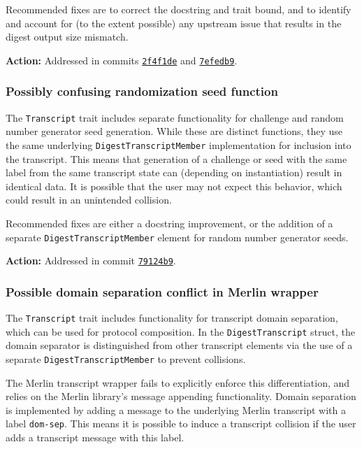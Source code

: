 \documentclass{article}
\begin{document}
Recommended fixes are to correct the docstring and trait bound, and to identify and account for (to the extent possible) any upstream issue that results in the digest output size mismatch.

\textbf{Action:} Addressed in commits \href{https://github.com/serai-dex/serai/commit/2f4f1de488272bc0d4f3a040e253534c24f7e7bb}{\texttt{2f4f1de}} and \href{https://github.com/serai-dex/serai/commit/7efedb9a9136ec3e37fec1cb35f33a8426d89a90}{\texttt{7efedb9}}.


\subsubsection{Possibly confusing randomization seed function}

The \texttt{Transcript} trait includes separate functionality for challenge and random number generator seed generation.
While these are distinct functions, they use the same underlying \texttt{DigestTranscriptMember} implementation for inclusion into the transcript.
This means that generation of a challenge or seed with the same label from the same transcript state can (depending on instantiation) result in identical data.
It is possible that the user may not expect this behavior, which could result in an unintended collision.

Recommended fixes are either a docstring improvement, or the addition of a separate \texttt{DigestTranscriptMember} element for random number generator seeds.

\textbf{Action:} Addressed in commit \href{https://github.com/serai-dex/serai/commit/79124b9a3394ae1eaadf066fb7bc431afdaf5be3}{\texttt{79124b9}}.


\subsubsection{Possible domain separation conflict in Merlin wrapper}

The \texttt{Transcript} trait includes functionality for transcript domain separation, which can be used for protocol composition.
In the \texttt{DigestTranscript} struct, the domain separator is distinguished from other transcript elements via the use of a separate \texttt{DigestTranscriptMember} to prevent collisions.

The Merlin transcript wrapper fails to explicitly enforce this differentiation, and relies on the Merlin library's message appending functionality.
Domain separation is implemented by adding a message to the underlying Merlin transcript with a label \texttt{dom-sep}.
This means it is possible to induce a transcript collision if the user adds a transcript message with this label.
\end{document}
